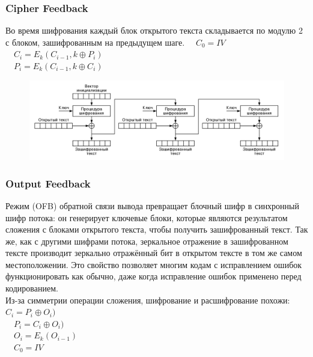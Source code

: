 \documentclass[10pt, typeface=serif(roman), pdf,hyperref={unicode}, aspectratio=169]{beamer}
\begin{document}
\begin{frame}
	\frametitle{Cipher Feedback}
	\begin{block}
		{
			 Во время шифрования каждый блок открытого текста складывается по модулю 2 с блоком, зашифрованным на предыдущем шаге. 
		}
		~~\(C_0 = IV\)\\
		~~\(C_i = E_k(C_{i-1},k \oplus P_i )\)\\
		~~\(P_i = E_k(C_{i-1},k \oplus C_i )\)\\
	\end{block}
	\begin{figure}
		\includegraphics[scale=0.18]{Шифрование в режиме обратной связи по шифротексту.png}	
	\end{figure}
\end{frame}



\begin{frame}
	\frametitle{Output Feedback}
	\begin{block}
		{
			Режим (OFB) обратной связи вывода превращает блочный шифр в синхронный шифр потока: он генерирует ключевые блоки, которые являются результатом сложения с блоками открытого текста, чтобы получить зашифрованный текст. Так же, как с другими шифрами потока, зеркальное отражение в зашифрованном тексте производит зеркально отражённый бит в открытом тексте в том же самом местоположении. Это свойство позволяет многим кодам с исправлением ошибок функционировать как обычно, даже когда исправление ошибок применено перед кодированием.\\		
			Из-за симметрии операции сложения, шифрование и расшифрование похожи: 
		}
		~~\(C_i = P_i \oplus O_i )\)\\
		~~\(P_i = C_i \oplus O_i )\)\\
		~~\(O_i = E_k (O_{i-1})\)\\
		~~\(C_0 = IV\)\\
	\end{block}
\end{frame}
\end{document}
